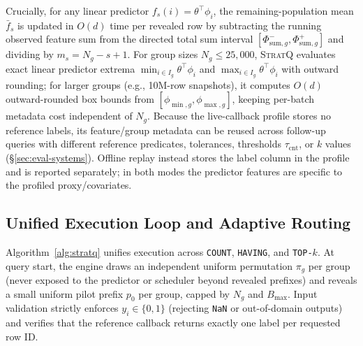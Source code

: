 Crucially, for any linear predictor $f_s(i) = \theta^\top \phi_i$, the remaining-population mean $\bar{f}_s$ is updated in $O(d)$ time per revealed row by subtracting the running observed feature sum from the directed total sum interval $[\Phi_{\text{sum},g}^-, \Phi_{\text{sum},g}^+]$ and dividing by $m_s = N_g - s + 1$.
For group sizes $N_g \le 25{,}000$, \textsc{StratQ} evaluates exact linear predictor extrema $\min_{i \in I_g} \theta^\top \phi_i$ and $\max_{i \in I_g} \theta^\top \phi_i$ with outward rounding; for larger groups (e.g., 10M-row snapshots), it computes $O(d)$ outward-rounded box bounds from $[\phi_{\min,g}, \phi_{\max,g}]$, keeping per-batch metadata cost independent of $N_g$.
Because the live-callback profile stores no reference labels, its feature/group metadata can be reused across follow-up queries with different reference predicates, tolerances, thresholds $\tau_{\text{cnt}}$, or $k$ values (\S\ref{sec:eval-systems}). Offline replay instead stores the label column in the profile and is reported separately; in both modes the predictor features are specific to the profiled proxy/covariates.

\subsection{Unified Execution Loop and Adaptive Routing}
\label{sec:sys-exec}

Algorithm~\ref{alg:stratq} unifies execution across \texttt{COUNT}, \texttt{HAVING}, and \texttt{TOP-$k$}.
At query start, the engine draws an independent uniform permutation $\pi_g$ per group (never exposed to the predictor or scheduler beyond revealed prefixes) and reveals a small uniform pilot prefix $p_0$ per group, capped by $N_g$ and $B_{\max}$.
Input validation strictly enforces $y_i \in \{0, 1\}$ (rejecting \texttt{NaN} or out-of-domain outputs) and verifies that the reference callback returns exactly one label per requested row ID.


